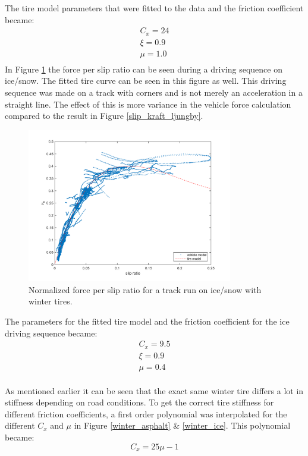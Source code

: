 The tire model parameters that were fitted to the data and the friction coefficient became:
\begin{equation}
\label{winter_asphalt}
\begin{split}
C_{x} = 24 \\
\xi = 0.9 \\
\mu = 1.0 \\
\end{split}
\end{equation}
In Figure \ref{slip_kraft_is} the force per slip ratio can be seen during a driving sequence on ice/snow. The fitted tire curve can be seen in this figure as well. This driving sequence was made on a track with corners and is not merely an acceleration in a straight line. The effect of this is more variance in the vehicle force calculation compared to the result in Figure \ref{slip_kraft_ljungby}. 

\begin{figure}[h]
	\centering
	\includegraphics[width=0.8\textwidth]{Pictures/slip_kraft_is}
	\caption {Normalized force per slip ratio for a track run on ice/snow with winter tires.}
	\label{slip_kraft_is}
\end{figure}

The parameters for the fitted tire model and the friction coefficient for the ice driving sequence became:
\begin{equation}
\label{winter_ice}
\begin{split}
C_{x} = 9.5 \\
\xi = 0.9 \\
\mu = 0.4 \\
\end{split}
\end{equation}

As mentioned earlier it can be seen that the exact same winter tire differs a lot in stiffness depending on road conditions. To get the correct tire stiffness for different friction coefficients, a first order polynomial was interpolated for the different $ C_{x} $ and $ \mu $ in Figure \ref{winter_asphalt} \& \ref{winter_ice}. This polynomial became:
\begin{equation}
	C_{x} = 25\mu - 1
\end{equation}

